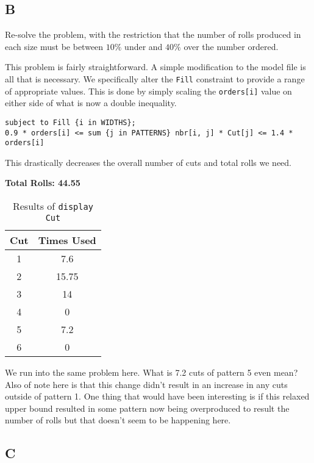 \subsection*{B}

\prob

Re-solve the problem, with the restriction that the number of rolls produced in each size must be between $10\%$ under and $40\%$ over the number ordered. 

\sol

This problem is fairly straightforward. A simple modification to the model file is all that is necessary. We specifically alter the \texttt{Fill} constraint to provide a range of appropriate values. This is done by simply scaling the \texttt{orders[i]} value on either side of what is now a double inequality.

\begin{lstlisting}
subject to Fill {i in WIDTHS};
0.9 * orders[i] <= sum {j in PATTERNS} nbr[i, j] * Cut[j] <= 1.4 * orders[i]
\end{lstlisting}

This drastically decreases the overall number of cuts and total rolls we need. 

\textbf{Total Rolls: 44.55}

\begin{table}[!ht]
	\centering
	\begin{tabular}{|c|c|}
		\hline
		Cut & Times Used \\
		\hline 
		1 & 7.6 \\
		2 & 15.75 \\
		3 & 14 \\
		4 & 0 \\
		5 & 7.2 \\
		6 & 0 \\
		\hline
	\end{tabular}
	\caption{Results of \texttt{display Cut}}
	\label{tab:<+label+>}
\end{table}


We run into the same problem here. What is 7.2 cuts of pattern 5 even mean? Also of note here is that this change didn't result in an increase in any cuts outside of pattern 1. One thing that would have been interesting is if this relaxed upper bound resulted in some pattern now being overproduced to result the number of rolls but that doesn't seem to be happening here.

\subsection*{C}

